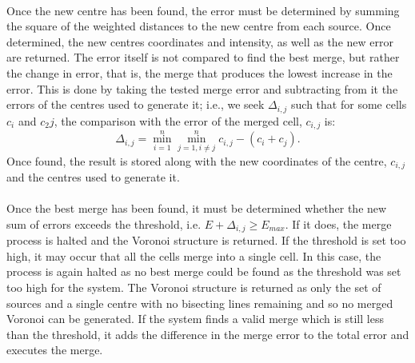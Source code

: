\\
Once the new centre has been found, the error must be determined by summing the square of the weighted distances to the new centre from each source. Once determined, the new centres coordinates and intensity, as well as the new error are returned. The error itself is not compared to find the best merge, but rather the change in error, that is, the merge that produces the lowest increase in the error. This is done by taking the tested merge error and subtracting from it the errors of the centres used to generate it; i.e., we seek $\Delta_{i,j}$ such that for some cells $c_i$ and $c_2j$, the comparison with the error of the merged cell, $c_{i,j}$ is:
\begin{equation}\label{des:eq:delta}
	\Delta_{i,j} = \min^n_{i = 1}\min^n_{j = 1, i \neq j}c_{i,j} - (c_i + c_j).
\end{equation}
Once found, the result is stored along with the new coordinates of the centre, $c_{i,j}$ and the centres used to generate it.
\\
\\
Once the best merge has been found, it must be determined whether the new sum of errors exceeds the threshold, i.e. $E + \Delta_{i,j} \geq E_{max}$. If it does, the merge process is halted and the Voronoi structure is returned. If the threshold is set too high, it may occur that all the cells merge into a single cell. In this case, the process is again halted as no best merge could be found as the threshold was set too high for the system. The Voronoi structure is returned as only the set of sources and a single centre with no bisecting lines remaining and so no merged Voronoi can be generated. If the system finds a valid merge which is still less than the threshold, it adds the difference in the merge error to the total error and executes the merge.

